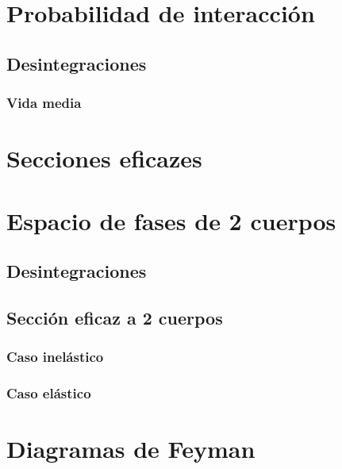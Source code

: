 \section{Probabilidad de interacción}

\subsection{Desintegraciones}

\subsubsection{Vida media}

\section{Secciones eficazes}

\section{Espacio de fases de 2 cuerpos}
\subsection{Desintegraciones}
\subsection{Sección eficaz a 2 cuerpos}
\subsubsection{Caso inelástico}
\subsubsection{Caso elástico}
\section{}
\section{Diagramas de Feyman}